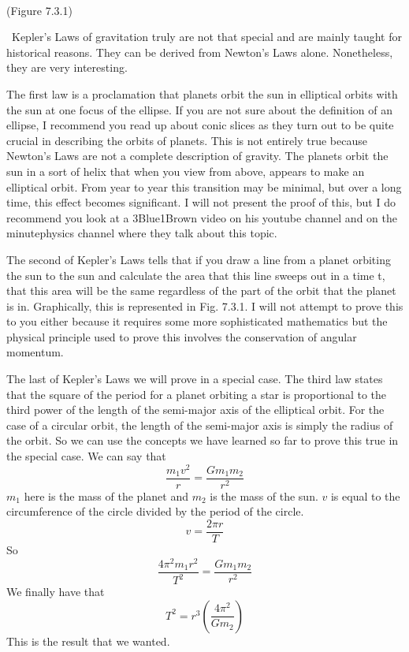 \
\
\
\begin{center}
(Figure 7.3.1)
\end{center}
\
Kepler’s Laws of gravitation truly are not that special and are mainly taught for historical reasons. They can be derived from Newton’s Laws alone. Nonetheless, they are very interesting.

The first law is a proclamation that planets orbit the sun in elliptical orbits with the sun at one focus of the ellipse. If you are not sure about the definition of an ellipse, I recommend you read up about conic slices as they turn out to be quite crucial in describing the orbits of planets. This is not entirely true because Newton’s Laws are not a complete description of gravity. The planets orbit the sun in a sort of helix that when you view from above, appears to make an elliptical orbit. From year to year this transition may be minimal, but over a long time, this effect becomes significant. I will not present the proof of this, but I do recommend you look at a 3Blue1Brown video on his youtube channel and on the minutephysics channel where they talk about this topic. 

The second of Kepler’s Laws tells that if you draw a line from a planet orbiting the sun to the sun and calculate the area that this line sweeps out in a time t, that this area will be the same regardless of the part of the orbit that the planet is in. Graphically, this is represented in Fig. 7.3.1. I will not attempt to prove this to you either because it requires some more sophisticated mathematics but the physical principle used to prove this involves the conservation of angular momentum. 

The last of Kepler’s Laws we will prove in a special case. The third law states that the square of the period for a planet orbiting a star is proportional to the third power of the length of the semi-major axis of the elliptical orbit. For the case of a circular orbit, the length of the semi-major axis is simply the radius of the orbit. So we can use the concepts we have learned so far to prove this true in the special case. We can say that $$\frac{m_1v^2}{r} =\frac{Gm_1m_2}{r^2}$$ $m_1$ here is the mass of the planet and $m_2$ is the mass of the sun. $v$ is equal to the circumference of the circle divided by the period of the circle. \begin{equation}v=\frac{2\pi r}{T}\end{equation} So \begin{equation}\frac{4 \pi^2 m_1 r^2}{T^2}=\frac{Gm_1m_2}{r^2}\end{equation} We finally have that \begin{equation}T^2=r^3 \left(\frac{4\pi^2}{Gm_2}\right)\end{equation} This is the result that we wanted.